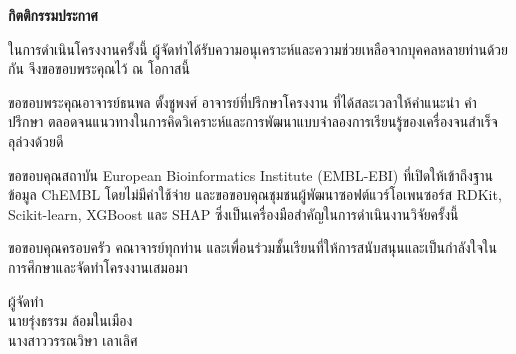 \clearpage
{}
{}

\begin{center}
{\large\bfseries กิตติกรรมประกาศ\par}
\end{center}
\vspace{0.6cm}

ในการดำเนินโครงงานครั้งนี้ ผู้จัดทำได้รับความอนุเคราะห์และความช่วยเหลือจากบุคคลหลายท่านด้วยกัน จึงขอขอบพระคุณไว้ ณ โอกาสนี้

ขอขอบพระคุณอาจารย์ธนพล ตั้งชูพงศ์ อาจารย์ที่ปรึกษาโครงงาน ที่ได้สละเวลาให้คำแนะนำ คำปรึกษา ตลอดจนแนวทางในการคิดวิเคราะห์และการพัฒนาแบบจำลองการเรียนรู้ของเครื่องจนสำเร็จลุล่วงด้วยดี

ขอขอบคุณสถาบัน European Bioinformatics Institute (EMBL-EBI) ที่เปิดให้เข้าถึงฐานข้อมูล ChEMBL โดยไม่มีค่าใช้จ่าย และขอขอบคุณชุมชนผู้พัฒนาซอฟต์แวร์โอเพนซอร์ส RDKit, Scikit-learn, XGBoost และ SHAP ซึ่งเป็นเครื่องมือสำคัญในการดำเนินงานวิจัยครั้งนี้

ขอขอบคุณครอบครัว คณาจารย์ทุกท่าน และเพื่อนร่วมชั้นเรียนที่ให้การสนับสนุนและเป็นกำลังใจในการศึกษาและจัดทำโครงงานเสมอมา

\vspace{1.5cm}
\begin{flushright}
ผู้จัดทำ\\[0.5em]
นายรุ่งธรรม ล้อมในเมือง\\
นางสาววรรณวิษา เลาเลิศ
\end{flushright}

\clearpage

